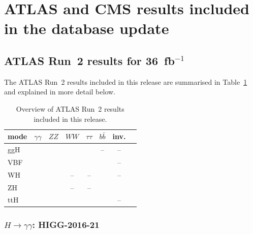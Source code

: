 \clearpage
\section{ATLAS and CMS results included in the database update}


\subsection{ATLAS Run~2 results for 36~fb$^{-1}$}

The ATLAS Run~2 results included in this release are summarised in Table~\ref{tab:ATLASresults} and explained in more detail below.

\begin{table}[h]\centering
\begin{tabular}{l | ccccccc}
mode & $\gamma\gamma$ & $ZZ$ & $WW$ & $\tau\tau$ & $b\bar b$ & inv. \\
\hline
ggH & \cite{Aaboud:2018xdt} & \cite{Aaboud:2017vzb} & \cite{Aaboud:2018jqu} & \cite{Aaboud:2018pen} & -- & --\\
VBF &  \cite{Aaboud:2018xdt} & \cite{Aaboud:2017vzb} & \cite{Aaboud:2018jqu} & \cite{Aaboud:2018pen} & \cite{Aaboud:2018gay} & -- \\
WH & \multirow{2}{*}{\!\!\cite{Aaboud:2018xdt}} & \multirow{2}{*}{\!\!\cite{Aaboud:2017vzb}} & -- & -- & \cite{Aaboud:2017xsd} & -- \\
ZH &  &  & -- & -- & \cite{Aaboud:2017xsd} & \cite{Aaboud:2017bja} \\
ttH & \cite{Aaboud:2018xdt,Aaboud:2017jvq} & \cite{Aaboud:2017vzb,Aaboud:2017jvq} & \cite{Aaboud:2017jvq} & \cite{Aaboud:2017jvq} & \cite{Aaboud:2017jvq,Aaboud:2017rss} & -- \\ 
\end{tabular}
\caption{Overview of ATLAS Run~2 results included in this release.} 
\label{tab:ATLASresults}
\end{table}


\subsubsection*{\boldmath $H\to\gamma\gamma$: HIGG-2016-21}

